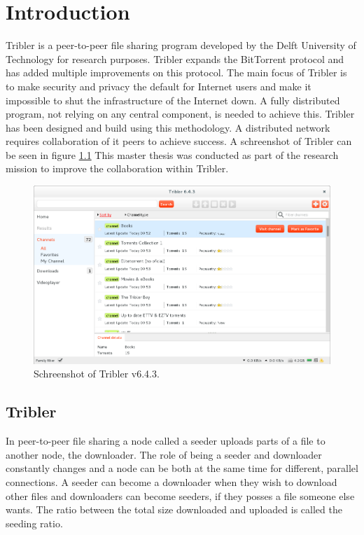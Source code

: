 \chapter{Introduction}
\label{chp:introduction}
Tribler is a peer-to-peer file sharing program developed by the Delft University of Technology for research purposes.
Tribler expands the BitTorrent protocol and has added multiple improvements on this protocol.
The main focus of Tribler is to make security and privacy the default for Internet users
and make it impossible to shut the infrastructure of the Internet down.
A fully distributed program, not relying on any central component, is needed to achieve this.
Tribler has been designed and build using this methodology\cite{Pouwelse-tribler}\cite{Bakker-tribler}.
A distributed network requires collaboration of it peers to achieve success.
A schreenshot of Tribler can be seen in figure \ref{fig:tribler-schreenshot}
This master thesis was conducted as part of the research mission to improve the collaboration within Tribler.

\begin{figure}
	\centerline{\includegraphics[scale=0.3]{introduction/figs/tribler-screenshot.png}}
	\caption{Schreenshot of Tribler v6.4.3.}
	\label{fig:tribler-schreenshot}
\end{figure}

\section{Tribler}
In peer-to-peer file sharing a node called a seeder uploads parts
of a file to another node, the downloader.
The role of being a seeder and downloader constantly changes
and a node can be both at the same time for different, parallel connections.
A seeder can become a downloader when they wish to download other files
and downloaders can become seeders,
if they posses a file someone else wants.
The ratio between the total size downloaded and uploaded is called the seeding ratio\cite{Cohen-bittorrent}.

